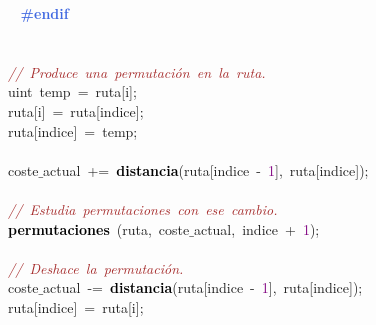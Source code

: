 \mbox{}\textbf{\textcolor{RoyalBlue}{\ \ \ \ \ \ \ \ \ \ \ \ \#endif}} \\
\mbox{} \\
\mbox{} \\
\mbox{}\ \ \ \ \ \ \ \ \ \ \ \ \textit{\textcolor{Brown}{//\ Produce\ una\ permutación\ en\ la\ ruta.}} \\
\mbox{}\ \ \ \ \ \ \ \ \ \ \ \ \textcolor{TealBlue}{uint}\ temp\ \textcolor{BrickRed}{=}\ ruta\textcolor{BrickRed}{[}i\textcolor{BrickRed}{];} \\
\mbox{}\ \ \ \ \ \ \ \ \ \ \ \ ruta\textcolor{BrickRed}{[}i\textcolor{BrickRed}{]}\ \textcolor{BrickRed}{=}\ ruta\textcolor{BrickRed}{[}indice\textcolor{BrickRed}{];} \\
\mbox{}\ \ \ \ \ \ \ \ \ \ \ \ ruta\textcolor{BrickRed}{[}indice\textcolor{BrickRed}{]}\ \textcolor{BrickRed}{=}\ temp\textcolor{BrickRed}{;} \\
\mbox{}\ \ \ \ \ \ \ \ \ \ \ \  \\
\mbox{}\ \ \ \ \ \ \ \ \ \ \ \ coste$\_$actual\ \textcolor{BrickRed}{+=}\ \textbf{\textcolor{Black}{distancia}}\textcolor{BrickRed}{(}ruta\textcolor{BrickRed}{[}indice\ \textcolor{BrickRed}{-}\ \textcolor{Purple}{1}\textcolor{BrickRed}{],}\ ruta\textcolor{BrickRed}{[}indice\textcolor{BrickRed}{]);} \\
\mbox{}\ \ \ \ \ \ \ \ \ \ \ \  \\
\mbox{}\ \ \ \ \ \ \ \ \ \ \ \ \textit{\textcolor{Brown}{//\ Estudia\ permutaciones\ con\ ese\ cambio.}} \\
\mbox{}\ \ \ \ \ \ \ \ \ \ \ \ \textbf{\textcolor{Black}{permutaciones}}\ \textcolor{BrickRed}{(}ruta\textcolor{BrickRed}{,}\ coste$\_$actual\textcolor{BrickRed}{,}\ indice\ \textcolor{BrickRed}{+}\ \textcolor{Purple}{1}\textcolor{BrickRed}{);} \\
\mbox{}\ \ \ \ \ \ \ \ \ \ \ \  \\
\mbox{}\ \ \ \ \ \ \ \ \ \ \ \ \textit{\textcolor{Brown}{//\ Deshace\ la\ permutación.}} \\
\mbox{}\ \ \ \ \ \ \ \ \ \ \ \ coste$\_$actual\ \textcolor{BrickRed}{-=}\ \textbf{\textcolor{Black}{distancia}}\textcolor{BrickRed}{(}ruta\textcolor{BrickRed}{[}indice\ \textcolor{BrickRed}{-}\ \textcolor{Purple}{1}\textcolor{BrickRed}{],}\ ruta\textcolor{BrickRed}{[}indice\textcolor{BrickRed}{]);} \\
\mbox{}\ \ \ \ \ \ \ \ \ \ \ \ ruta\textcolor{BrickRed}{[}indice\textcolor{BrickRed}{]}\ \textcolor{BrickRed}{=}\ ruta\textcolor{BrickRed}{[}i\textcolor{BrickRed}{];} \\
